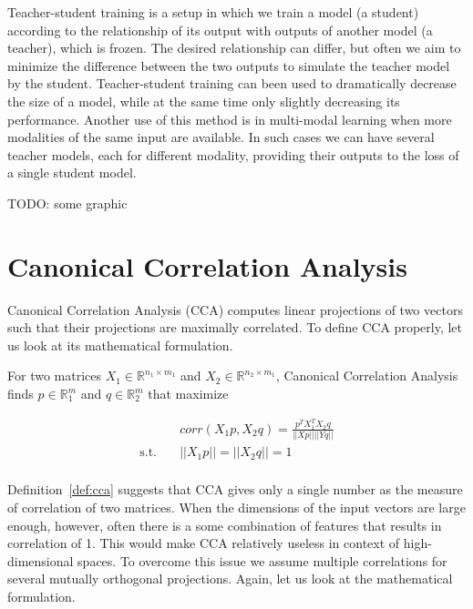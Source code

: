 Teacher-student training is a setup in which we train a model (a student)
according to the relationship of its output with outputs of another model (a
teacher), which is frozen. The desired relationship can differ, but often we
aim to minimize the difference between the two outputs to simulate the teacher
model by the student. Teacher-student training can been used to dramatically
decrease the size of a model, while at the same time only slightly decreasing
its performance. Another use of this method is in multi-modal learning when
more modalities of the same input are available. In such cases we can have
several teacher models, each for different modality, providing their outputs to
the loss of a single student model.

TODO: some graphic

\section{Canonical Correlation Analysis}

Canonical Correlation Analysis (CCA) computes linear projections of two vectors
such that their projections are maximally correlated. To define CCA properly,
let us look at its mathematical formulation.

\begin{defn}\label{def:cca}

  For two matrices $X_1 \in \mathbb{R}^{n_1 \times m_1}$ and $X_2 \in
  \mathbb{R}^{n_2 \times m_1}$, Canonical Correlation Analysis finds $p \in
  \mathbb{R}^m_1$ and $q \in \mathbb{R}^m_2$ that maximize

  \begin{equation}
    \begin{split}
      & corr(X_1p, X_2q) = \frac{p^TX_1^TX_2q}{||Xp|| ||Yq||} \\
      \text{s.t.}\quad &||X_1p|| = ||X_2q|| = 1 \\
    \end{split}
  \end{equation}


\end{defn}

Definition~\ref{def:cca} suggests that CCA gives only a single number as the
measure of correlation of two matrices. When the dimensions of the input
vectors are large enough, however, often there is a some combination of
features that results in correlation of 1. This would make CCA relatively
useless in context of high-dimensional spaces. To overcome this issue we assume
multiple correlations for several mutually orthogonal projections. Again, let
us look at the mathematical formulation.

